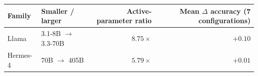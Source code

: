 \begin{tabular}{@{}llrr@{}}
\toprule
Family & Smaller / larger & Active-parameter ratio & Mean $\Delta$ accuracy (7 configurations) \\
\midrule
Llama    & 3.1-8B $\to$ 3.3-70B & $8.75\times$ & $+0.10$ \\
Hermes-4 & 70B $\to$ 405B       & $5.79\times$ & $+0.01$ \\
\bottomrule
\end{tabular}
